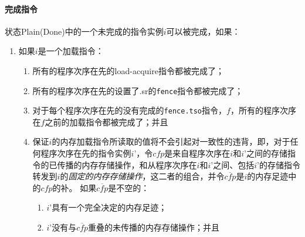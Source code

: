 \paragraph{完成指令}\label{omm:finish}
状态{\sc Plain}({\sc Done})中的一个未完成的指令实例$i$可以被完成，如果：
\begin{enumerate}
\item 如果$i$是一个加载指令： %
  \begin{enumerate}
  \item 所有的程序次序在先的load-acquire指令都被完成了； %
  \item 所有的程序次序在先的设置了.sr的{\tt fence}指令都被完成了； %
  \item 对于每个程序次序在先的没有完成的{\tt fence.tso}指令，$f$，所有的程序次序在$f$之前的加载指令都被完成了；并且  %
  \item 保证$i$的内存加载指令所读取的值将不会引起对一致性的违背，即，对于任何程序次序在先的指令实例$i’$，令$\textit{cfp}$是来自程序次序在$i$和$i’$之间的存储指令的已传播的内存存储操作，和从程序次序在$i$和$i’$之间、包括$i’$的存储指令转发到$i$的{\em 固定的内存存储操作}，这二者的组合，并令$\overline{\textit{cfp}}$是$i$的内存足迹中的$\textit{cfp}$的补。
  如果$\overline{\textit{cfp}}$是不空的： 
    \begin{enumerate}
    \item $i’$具有一个完全决定的内存足迹； %
    \item $i’$没有与$\overline{\textit{cfp}}$重叠的未传播的内存存储操作；并且  %

\end{enumerate}
\end{enumerate}
\end{enumerate}
